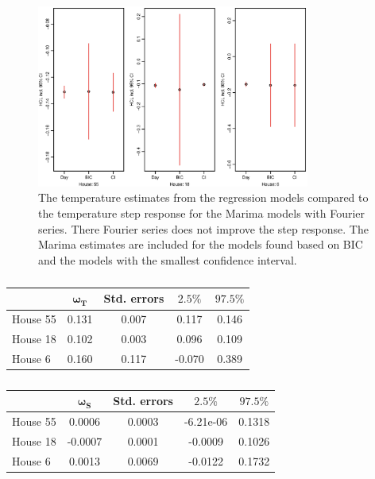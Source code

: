 \begin{figure}
    \centering
    \includegraphics[width=0.8\textwidth]{../../../figures/MarimaHCLF.eps}
    \caption{The temperature estimates from the regression models compared to the temperature step response for the Marima models with Fourier series. There Fourier series does not improve the step response. The Marima estimates are included for the models found based on BIC and the models with the smallest confidence interval.}
    \label{fig:HCLF}
\end{figure}





\begin{table}[H]
    \centering
    \begin{tabular}{l|cccc}
    \hline
     & $\bm{\omega_{T}}$ & \textbf{Std. errors} & $\bm{2.5\%}$ & $\bm{97.5\%}$ \\ \hline \hline
    House 55 & 0.131 & 0.007 & 0.117 & 0.146 \\
    House 18 & 0.102 & 0.003 & 0.096 & 0.109 \\
    House 6  & 0.160 & 0.117 & -0.070 & 0.389\\
    \hline
    \end{tabular}
    \caption{}
    \label{tab: result_temp}
 \end{table}

 \begin{table}[H]
    \centering
    \begin{tabular}{l|cccc}
    \hline
     & $\bm{\omega_S}$ & \textbf{Std. errors} & $\bm{2.5\%}$ & $\bm{97.5\%}$ \\ \hline \hline
    House 55 & 0.0006 & 0.0003 & -6.21e-06 & 0.1318 \\
    House 18 & -0.0007 & 0.0001 & -0.0009 & 0.1026 \\
    House 6  & 0.0013 & 0.0069 & -0.0122 & 0.1732 \\
    \hline
    \end{tabular}
    \caption{}
    \label{tab: result_solar}
 \end{table}


